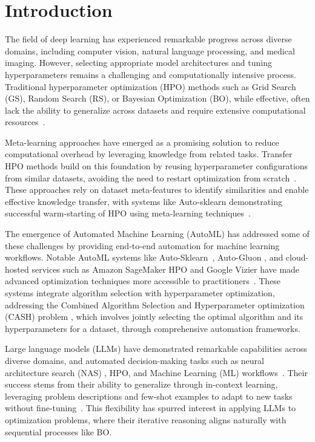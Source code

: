 \documentclass{article}
\begin{document}


%
\section{Introduction}
The field of deep learning has experienced remarkable progress across diverse domains, including computer vision, natural language processing, and medical imaging. However, selecting appropriate model architectures and tuning hyperparameters remains a challenging and computationally intensive process. Traditional hyperparameter optimization (HPO) methods such as Grid Search (GS), Random Search (RS), or Bayesian Optimization (BO), while effective, often lack the ability to generalize across datasets and require extensive computational resources~\cite{franceschi2024hpo,bischl2021foundations}.

Meta-learning approaches have emerged as a promising solution to reduce computational overhead by leveraging knowledge from related tasks. Transfer HPO methods build on this foundation by reusing hyperparameter configurations from similar datasets, avoiding the need to restart optimization from scratch~\cite{wistuba2021few,vanschoren2018meta}. These approaches rely on dataset meta-features to identify similarities and enable effective knowledge transfer, with systems like Auto-sklearn demonstrating successful warm-starting of HPO using meta-learning techniques~\cite{feurer2022auto}.

The emergence of Automated Machine Learning (AutoML) has addressed some of these challenges by providing end-to-end automation for machine learning workflows. Notable AutoML systems like Auto-Sklearn~\cite{feurer2022auto}, Auto-Gluon \cite{erickson2020autogluon}, and cloud-hosted services such as Amazon SageMaker HPO \cite{perrone2020amazon} and Google Vizier \cite{golovin2017google} have made advanced optimization techniques more accessible to practitioners~\cite{yu2020hpo}. These systems integrate algorithm selection with hyperparameter optimization, addressing the Combined Algorithm Selection and Hyperparameter optimization (CASH) problem \cite{thornton2013auto}, which involves jointly selecting the optimal algorithm and its hyperparameters for a dataset, through comprehensive automation frameworks.

Large language models (LLMs) have demonstrated remarkable capabilities across diverse domains, and automated decision-making tasks such as neural architecture search (NAS) \cite{zheng2023can}, HPO, and Machine Learning (ML) workflows~\cite{yang2023large}. Their success stems from their ability to generalize through in-context learning, leveraging problem descriptions and few-shot examples to adapt to new tasks without fine-tuning~\cite{brown2020language,zhao2023survey}. This flexibility has spurred interest in applying LLMs to optimization problems, where their iterative reasoning aligns naturally with sequential processes like BO.
\end{document}
